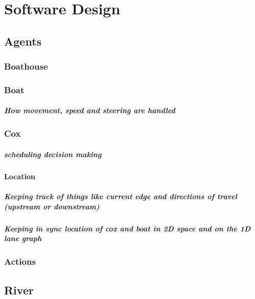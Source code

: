 \chapter{Software Design}

\section{Agents}
  \subsection{Boathouse}
  
  \subsection{Boat}
    
    \paragraph{How movement, speed and steering are handled}
    
  \subsection{Cox}
    \paragraph{scheduling decision making}
    \subsubsection{Location}
      \paragraph{Keeping track of things like current edge and directions of travel (upstream or downstream)}
      \paragraph{Keeping in sync location of cox and boat in 2D space and on the 1D lane graph}
    
  \subsection{Actions}
  
\section{River}
